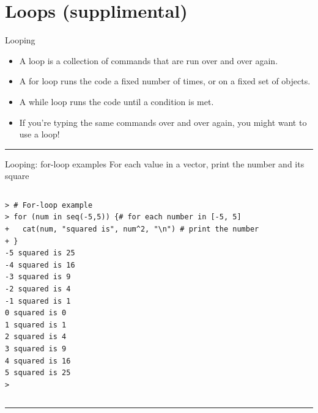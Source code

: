 \documentclass[table,smaller]{beamer}
\begin{document}
\section{Loops (supplimental)}
\label{sec-10}

\begin{frame}[label=sec-10-1]{Looping}
\begin{itemize}
\item A loop is a collection of commands that are run over and over again.
\item A for loop runs the code a fixed number of times, or on a fixed set of objects.
\item A while loop runs the code until a condition is met.
\item If you're typing the same commands over and over again, you might want to use a loop!
\end{itemize}

\rule{\linewidth}{0.5pt}
\end{frame}
\begin{frame}[fragile,label=sec-10-2]{Looping: for-loop examples}
 For each value in a vector, print the number and its square
\vspace{-.5em}
\begin{columns}
\begin{block}{}
\begin{verbatim}
> # For-loop example
> for (num in seq(-5,5)) {# for each number in [-5, 5]
+   cat(num, "squared is", num^2, "\n") # print the number
+ }
-5 squared is 25 
-4 squared is 16 
-3 squared is 9 
-2 squared is 4 
-1 squared is 1 
0 squared is 0 
1 squared is 1 
2 squared is 4 
3 squared is 9 
4 squared is 16 
5 squared is 25 
>
\end{verbatim}
\end{block}
\end{columns}
\vspace{.5em}

\rule{\linewidth}{0.5pt}
\end{frame}
\end{document}
